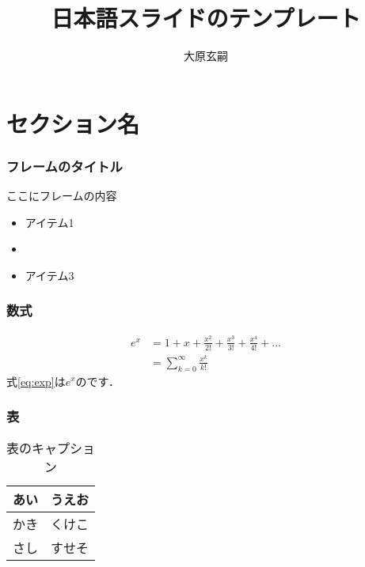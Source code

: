 \documentclass{slide-ja}
\title{日本語スライドのテンプレート}
\author{大原玄嗣}
\begin{document}
\section{セクション名}

\begin{frame}
  \frametitle{フレームのタイトル}
  ここにフレームの内容
  \begin{itemize}
    \item アイテム1
    \item {}
    \item アイテム3
  \end{itemize}
\end{frame}

\begin{frame}
  \frametitle{数式}
  \begin{align}
    \label{eq:exp}
    e^x & = 1 + x + \frac{x^2}{2!} + \frac{x^3}{3!} + \frac{x^4}{4!} + \ldots \\
        & =\sum_{k=0}^\infty \frac{x^k}{k!}
  \end{align}
  式\eqref{eq:exp}は$e^x$のです．
\end{frame}

\begin{frame}
  \frametitle{表}
  \begin{table}
    \caption{表のキャプション}
    \begin{tabular}{ll}
      \toprule
      あい & うえお \\
      \midrule
      かき & くけこ \\
      さし & すせそ \\
      \bottomrule
    \end{tabular}
  \end{table}
\end{frame}
\end{document}
